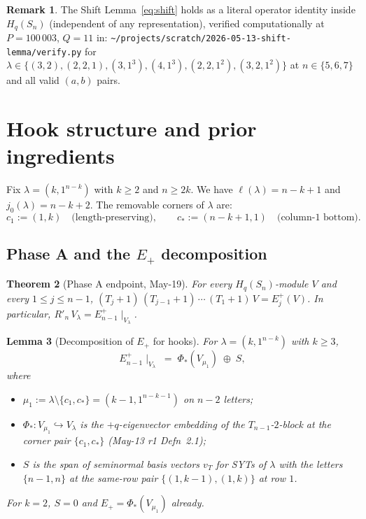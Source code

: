 \documentclass[11pt]{article}
\newtheorem{theorem}{Theorem}
\newtheorem{lemma}[theorem]{Lemma}
\theoremstyle{definition}
\newtheorem{remark}[theorem]{Remark}
\begin{document}
\begin{remark}\label{rem:shift-computational}
The Shift Lemma~\eqref{eq:shift} holds as a literal operator identity
inside $H_q(S_n)$ (independent of any representation), verified
computationally at $P = 100\,003$, $Q = 11$ in:
\texttt{\textasciitilde/projects/scratch/2026-05-13-shift-lemma/verify.py}
for $\lambda \in \{(3, 2), (2, 2, 1), (3, 1^3), (4, 1^3), (2, 2, 1^2),
(3, 2, 1^2)\}$ at $n \in \{5, 6, 7\}$ and all valid $(a, b)$ pairs.
\end{remark}

\section{Hook structure and prior ingredients}\label{sec:ingredients}

Fix $\lambda = (k, 1^{n-k})$ with $k \ge 2$ and $n \ge 2k$.  We have
$\ell(\lambda) = n - k + 1$ and $j_0(\lambda) = n - k + 2$.  The
removable corners of $\lambda$ are:
\[
   c_1 := (1, k) \quad\text{(length-preserving)},
   \qquad
   c_* := (n - k + 1, 1) \quad\text{(column-1 bottom)}.
\]

\subsection{Phase A and the $E_+$ decomposition}\label{sec:phaseA}

\begin{theorem}[Phase A endpoint, May-19]\label{thm:phaseA}
For every $H_q(S_n)$-module $V$ and every $1 \le j \le n - 1$,
$(T_j+1)\,(T_{j-1}+1)\,\cdots\,(T_1+1)\,V = E_j^+(V)$.  In particular,
$R'_n\,V_\lambda = E_{n-1}^+\!\mid_{V_\lambda}$.
\end{theorem}

\begin{lemma}[Decomposition of $E_+$ for hooks]\label{lem:E-decomp}
For $\lambda = (k, 1^{n-k})$ with $k \ge 3$,
\begin{equation}\label{eq:E-decomp}
   E_{n-1}^+\!\mid_{V_\lambda}
   \;=\;
   \Phi_*(V_{\mu_1}) \;\oplus\; S,
\end{equation}
where
\begin{itemize}[leftmargin=2em,topsep=0.2em,itemsep=0.1em]
\item $\mu_1 := \lambda \setminus \{c_1, c_*\} = (k-1, 1^{n-k-1})$
on $n - 2$ letters;
\item $\Phi_*: V_{\mu_1} \hookrightarrow V_\lambda$ is the
$+q$-eigenvector embedding of the $T_{n-1}$-$2$-block at the corner
pair $\{c_1, c_*\}$ (May-13 r1 Defn~2.1);
\item $S$ is the span of seminormal basis vectors $v_T$ for SYTs of
$\lambda$ with the letters $\{n-1, n\}$ at the same-row pair
$\{(1, k-1), (1, k)\}$ at row $1$.
\end{itemize}
For $k = 2$, $S = 0$ and $E_+ = \Phi_*(V_{\mu_1})$ already.
\end{lemma}
\end{document}
